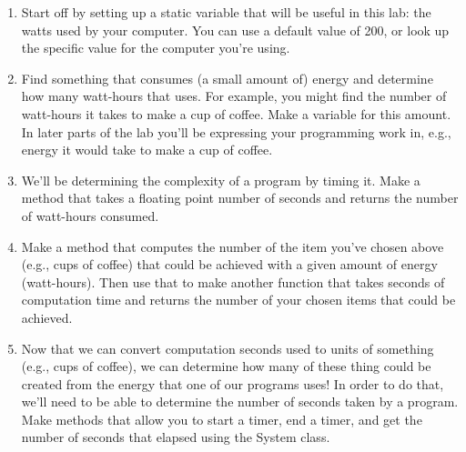 \documentclass[12pt]{article}
\begin{document}
\begin{enumerate}
\item Start off by setting up a static variable that will be useful in this lab: the watts used by your computer.  You can use a default value of 200, or look up the specific value for the computer you're using.
\item Find something that consumes (a small amount of) energy and determine how many watt-hours that uses. For example, you might find the number of watt-hours it takes to make a cup of coffee. Make a variable for this amount. In later parts of the lab you'll be expressing your programming work in, e.g., energy it would take to make a cup of coffee.
\item We'll be determining the complexity of a program by timing it. Make a method that takes a floating point number of seconds and returns the number of watt-hours consumed.
\item Make a method that computes the number of the item you've chosen above (e.g., cups of coffee) that could be achieved with a given amount of energy (watt-hours). Then use that to make another function that takes seconds of computation time and returns the number of your chosen items that could be achieved.
\item Now that we can convert computation seconds used to units of something (e.g., cups of coffee), we can determine how many of these thing could be created from the energy that one of our programs uses! In order to do that, we'll need to be able to determine the number of seconds taken by a program.  Make methods that allow you to start a timer, end a timer, and get the number of seconds that elapsed using the System class.
\end{enumerate}
\end{document}

